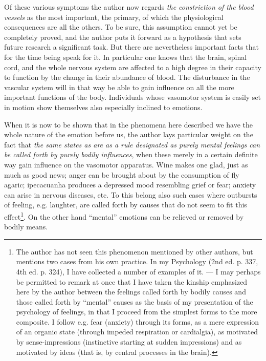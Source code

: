 \documentclass[12pt,a4paper,openany]{book}
\newcommand{\opage}[1]{\marginnote{\footnotesize\textit{[#1]}}}
\begin{document}
Of these various symptoms the author now regards
\opage{54}\emph{the constriction of the blood vessels} as the most important, the primary, of which
the physiological consequences are all the others. To be sure, this
assumption cannot yet be completely proved, and the author puts
it forward as a hypothesis that sets future research a
significant task. But there are nevertheless important facts
that for the time being speak for it. In particular one knows that the brain,
spinal cord, and the whole nervous system are affected to a high degree
in their capacity to function by the change in their abundance of blood.
The disturbance in the vascular system will in that way be able to gain
influence on all the more important functions of the body. Individuals
whose vasomotor system is easily set in motion show
themselves also especially inclined to emotions.

When it is now to be shown that in the phenomena
here described we have the whole nature of the emotion before us, the
author lays particular weight on the fact that \emph{the same states as are
as a rule designated as purely mental feelings can be called forth
by purely bodily influences}, when these merely in a certain
definite way gain influence on the vasomotor apparatus.
Wine makes one glad, just as much as good news; anger can
be brought about by the consumption of fly agaric; ipecacuanha produces
a depressed mood resembling grief or fear; anxiety
can arise in nervous diseases, etc. To this belong
also such cases where outbursts of feeling, e.g. laughter,
are called forth by causes that do not seem to fit this
effect\footnote{The author has not seen this phenomenon mentioned by other authors, but
mentions two cases from his own practice. In my Psychology
(2nd ed. p. 337, 4th ed. p. 324), I have collected a number of examples of it.
--- I may perhaps be permitted to remark at once
that I have taken the kinship emphasized here by the author between the
feelings called forth by bodily causes and those called forth by ``mental'' causes
as the basis of my presentation of the psychology of feelings, in that I proceed
from the simplest forms to the more composite. I follow e.g.
fear (anxiety) through its forms, as a mere expression of an
organic state (through impeded respiration or cardialgia), as
motivated by sense-impressions (instinctive starting at sudden
impressions) and as motivated by ideas %
 (that is, by central
processes in the brain).}. On the other hand ``mental''
emotions can be relieved or removed by bodily means.
\end{document}
